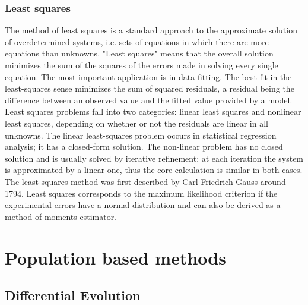 
\subsubsection{Least squares}
  The method of least squares is a standard approach to the approximate solution of overdetermined systems, i.e. sets of equations in which there are more equations than unknowns.
 "Least squares" means that the overall solution minimizes the sum of the squares of the errors made in solving every single equation.
 The most important application is in data fitting.
 The best fit in the least-squares sense minimizes the sum of squared residuals, a residual being the difference between an observed value and the fitted value provided by a model.
  Least squares problems fall into two categories: linear least squares and nonlinear least squares, depending on whether or not the residuals are linear in all unknowns.
  The linear least-squares problem occurs in statistical regression analysis; it has a closed-form solution.
  The non-linear problem has no closed solution and is usually solved by iterative refinement; at each iteration the system is approximated by a linear one, thus the core calculation is similar in both cases.
  The least-squares method was first described by Carl Friedrich Gauss around 1794.%
  Least squares corresponds to the maximum likelihood criterion if the experimental errors have a normal distribution and can also be derived as a method of moments estimator.

\section{Population based methods}
\subsection{Differential Evolution}
